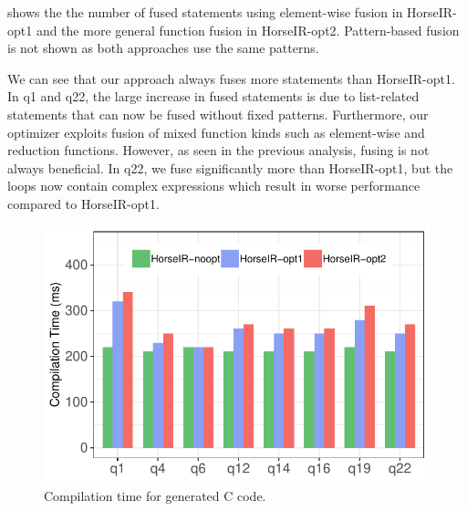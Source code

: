  shows the the number of fused statements using
element-wise fusion in HorseIR-opt1 and the more general function fusion in
HorseIR-opt2. Pattern-based fusion is not shown as both approaches use the
same patterns. 

We can see that our approach always fuses more statements than HorseIR-opt1.
In q1 and q22, the large increase in fused statements is due to list-related
statements that can now be fused without fixed patterns. Furthermore, our optimizer
exploits fusion of mixed function kinds such as element-wise and reduction functions.
However, as seen in the previous analysis, fusing is not always beneficial. In q22,
we fuse significantly more than HorseIR-opt1, but the loops now contain complex
expressions which result in worse performance compared to HorseIR-opt1.

\begin{figure}[htbp]
\centering
\includegraphics[width=.9\columnwidth]{./src/figure/compile-time.pdf}
\caption{Compilation time for generated C code.}
\label{fig:compilation_time}
\end{figure}




